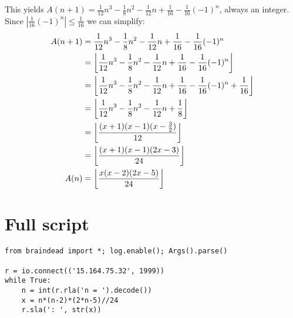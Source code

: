 \documentclass{article}
\begin{document}
This yields $A(n+1) = \frac{1}{12}n^3 - \frac{1}{8}n^2 - \frac{1}{12}n + \frac{1}{16} - \frac{1}{16}(-1)^n$, always an integer.
Since $|\frac{1}{16}(-1)^n| \leq \frac{1}{16}$ we can simplify:
\begin{equation}
\begin{split}
A(n+1) & = \frac{1}{12}n^3 - \frac{1}{8}n^2 - \frac{1}{12}n + \frac{1}{16} - \frac{1}{16}(-1)^n \\
     & = \floor*{\frac{1}{12}n^3 - \frac{1}{8}n^2 - \frac{1}{12}n + \frac{1}{16} - \frac{1}{16}(-1)^n} \\
     & = \floor*{\frac{1}{12}n^3 - \frac{1}{8}n^2 - \frac{1}{12}n + \frac{1}{16} - \frac{1}{16}(-1)^n + \frac{1}{16}} \\
     & = \floor*{\frac{1}{12}n^3 - \frac{1}{8}n^2 - \frac{1}{12}n + \frac{1}{8}} \\
     & = \floor*{\frac{(x+1)(x-1)(x-\frac{3}{2})}{12}} \\
     & = \floor*{\frac{(x+1)(x-1)(2x-3)}{24}} \\
A(n) & = \floor*{\frac{x(x-2)(2x-5)}{24}} \\
\end{split}
\end{equation}

\section{Full script}

\begin{verbatim}
from braindead import *; log.enable(); Args().parse()

r = io.connect(('15.164.75.32', 1999))
while True:
	n = int(r.rla('n = ').decode())
	x = n*(n-2)*(2*n-5)//24
	r.sla(': ', str(x))
\end{verbatim}
\end{document}
